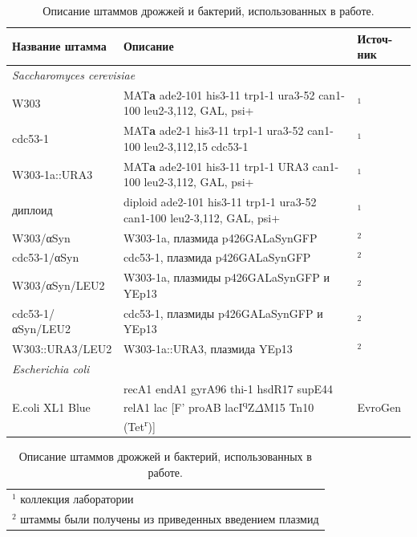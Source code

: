 \begin{table}[p]
	\small
	\caption{Описание штаммов дрожжей и бактерий, использованных в работе.}
	\label{table:strains}
	\begin{tabular}{ p{0.25\width - \tabcolsep} p{0.65\width - 2\tabcolsep}  p{0.1\width - \tabcolsep}}
		\graytable
		\toprule
		Название штамма & Описание & Источ-ник \\ 
		\midrule
		
		\multicolumn{3}{l}{ \textit{Saccharomyces cerevisiae} }\\
		\invisiblerule
		W303 &
			MAT\textbf{a} ade2-101 his3-11 trp1-1 ura3-52 can1-100 leu2-3,112, GAL, psi+ &
			$^1$ \\  \invisiblerule
		cdc53-1 &
			MAT\textbf{a} ade2-1 his3-11 trp1-1 ura3-52 can1-100 leu2-3,112,15 cdc53-1 &
			$^1$ \\  \invisiblerule
		W303-1a::URA3 &
			 MAT\textbf{a} ade2-101 his3-11 trp1-1 URA3 can1-100 leu2-3,112, GAL, psi+&
			$^1$ \\  \invisiblerule
		диплоид &  
			diploid ade2-101 his3-11 trp1-1 ura3-52 can1-100 leu2-3,112, GAL, psi+ 
			& $^1$\\   \invisiblerule
		W303/αSyn &  W303-1a, плазмида p426GALaSynGFP & $^2$\\  \invisiblerule
		cdc53-1/αSyn &  cdc53-1, плазмида p426GALaSynGFP & $^2$ \\  \invisiblerule
		W303/αSyn/LEU2 &  W303-1a, плазмиды p426GALaSynGFP и YEp13 & $^2$ \\  \invisiblerule
		cdc53-1/αSyn/LEU2 &  cdc53-1, плазмиды p426GALaSynGFP и YEp13 & $^2$\\  \invisiblerule
		W303::URA3/LEU2& W303-1a::URA3, плазмида YEp13 & $^2$ \\
		
		\midrule
		\multicolumn{3}{l}{\textit{Escherichia coli} }\\ \invisiblerule
		E.coli XL1 Blue &
		recA1 endA1 gyrA96 thi-1 hsdR17 supE44 relA1 lac [F' proAB lacI\textsuperscript{q}Z$\Delta$M15 Tn10 (Tet\textsuperscript{r})]&
		\scriptsize{EvroGen\texttrademark} \\
		
		
		\bottomrule
	\end{tabular}
	\begin{tabular}{p{1\width}}
			$^1$ коллекция лаборатории \\
			$^2$ штаммы были получены из приведенных введением плазмид
			\\
	\end{tabular}
	
\end{table}





